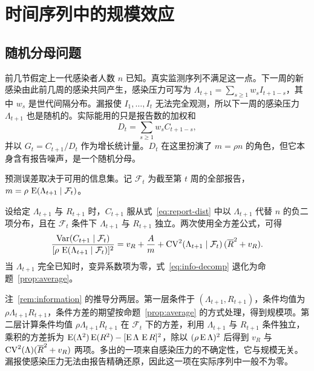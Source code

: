 \section{时间序列中的规模效应}
\label{sec:design-renewal}

\subsection{随机分母问题}

前几节假定上一代感染者人数 $n$ 已知。真实监测序列不满足这一点。下一周的新感染由此前几周的感染共同产生，感染压力可写为 $\Lambda_{t+1}=\sum_{s\geq1}w_sI_{t+1-s}$，其中 $w_s$ 是世代间隔分布。漏报使 $I_1,\dots,I_t$ 无法完全观测，所以下一周的感染压力 $\Lambda_{t+1}$ 也是随机的。实际能用的只是报告数的加权和
\begin{equation}
  D_t=\sum_{s\geq1}w_sC_{t+1-s},
  \label{eq:dt}
\end{equation}
并以 $G_t=C_{t+1}/D_t$ 作为增长统计量。$D_t$ 在这里扮演了 $m=\rho n$ 的角色，但它本身含有报告噪声，是一个随机分母。

预测误差取决于可用的信息集。记 $\mathcal F_t$ 为截至第 $t$ 周的全部报告，$m=\rho\,\operatorname{E}(\Lambda_{t+1}\mid\mathcal F_t)$。

\begin{remark}
\label{rem:information}
设给定 $\Lambda_{t+1}$ 与 $R_{t+1}$ 时，$C_{t+1}$ 服从式~\eqref{eq:report-dist} 中以 $\Lambda_{t+1}$ 代替 $n$ 的负二项分布，且在 $\mathcal F_t$ 条件下 $\Lambda_{t+1}$ 与 $R_{t+1}$ 独立。两次使用全方差公式，可得
\begin{equation}
  \frac{\operatorname{Var}(C_{t+1}\mid\mathcal F_t)}{[\rho\,\operatorname{E}(\Lambda_{t+1}\mid\mathcal F_t)]^2}
  =v_R+\frac{A}{m}+\operatorname{CV}^2(\Lambda_{t+1}\mid\mathcal F_t)\,(\overline{R}^2+v_R).
  \label{eq:info-decomp}
\end{equation}
当 $\Lambda_{t+1}$ 完全已知时，变异系数项为零，式~\eqref{eq:info-decomp} 退化为命题~\ref{prop:average}。
\end{remark}

注~\ref{rem:information} 的推导分两层。第一层条件于 $(\Lambda_{t+1},R_{t+1})$，条件均值为 $\rho\Lambda_{t+1}R_{t+1}$，条件方差的期望按命题~\ref{prop:average} 的方式处理，得到规模项。第二层计算条件均值 $\rho\Lambda_{t+1}R_{t+1}$ 在 $\mathcal F_t$ 下的方差，利用 $\Lambda_{t+1}$ 与 $R_{t+1}$ 条件独立，乘积的方差拆为 $\operatorname{E}(\Lambda^2)\operatorname{E}(R^2)-[\operatorname{E}\Lambda\,\operatorname{E} R]^2$，除以 $(\rho\operatorname{E}\Lambda)^2$ 后得到 $v_R$ 与 $\operatorname{CV}^2(\Lambda)(\overline{R}^2+v_R)$ 两项。多出的一项来自感染压力的不确定性，它与规模无关。漏报使感染压力无法由报告精确还原，因此这一项在实际序列中一般不为零。

